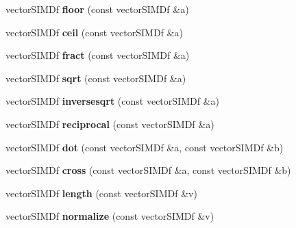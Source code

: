 \begin{DoxyCompactItemize}
\item 
vector\+S\+I\+M\+Df {\bfseries floor} (const vector\+S\+I\+M\+Df \&a)\hypertarget{namespaceirr_a913c3ea3611dc23b0fa62fd6e1348841}{}\label{namespaceirr_a913c3ea3611dc23b0fa62fd6e1348841}

\item 
vector\+S\+I\+M\+Df {\bfseries ceil} (const vector\+S\+I\+M\+Df \&a)\hypertarget{namespaceirr_a2ab9b9ed9c718fe4891c48f40ef6e8cc}{}\label{namespaceirr_a2ab9b9ed9c718fe4891c48f40ef6e8cc}

\item 
vector\+S\+I\+M\+Df {\bfseries fract} (const vector\+S\+I\+M\+Df \&a)\hypertarget{namespaceirr_a2ea9f347e3b1056ce5d974b19a832c30}{}\label{namespaceirr_a2ea9f347e3b1056ce5d974b19a832c30}

\item 
vector\+S\+I\+M\+Df {\bfseries sqrt} (const vector\+S\+I\+M\+Df \&a)\hypertarget{namespaceirr_a81e517d146fc58967964a00cabbb5fc3}{}\label{namespaceirr_a81e517d146fc58967964a00cabbb5fc3}

\item 
vector\+S\+I\+M\+Df {\bfseries inversesqrt} (const vector\+S\+I\+M\+Df \&a)\hypertarget{namespaceirr_a53e656bb85fc627fd78570e2ef4432ce}{}\label{namespaceirr_a53e656bb85fc627fd78570e2ef4432ce}

\item 
vector\+S\+I\+M\+Df {\bfseries reciprocal} (const vector\+S\+I\+M\+Df \&a)\hypertarget{namespaceirr_a1f503fb09c23545f0c1f1bcf82e096bb}{}\label{namespaceirr_a1f503fb09c23545f0c1f1bcf82e096bb}

\item 
vector\+S\+I\+M\+Df {\bfseries dot} (const vector\+S\+I\+M\+Df \&a, const vector\+S\+I\+M\+Df \&b)\hypertarget{namespaceirr_ae9fe6b99bb08338fef5ffa5d1107c05a}{}\label{namespaceirr_ae9fe6b99bb08338fef5ffa5d1107c05a}

\item 
vector\+S\+I\+M\+Df {\bfseries cross} (const vector\+S\+I\+M\+Df \&a, const vector\+S\+I\+M\+Df \&b)\hypertarget{namespaceirr_ad793371b2d476f613f660d76547ee36c}{}\label{namespaceirr_ad793371b2d476f613f660d76547ee36c}

\item 
vector\+S\+I\+M\+Df {\bfseries length} (const vector\+S\+I\+M\+Df \&v)\hypertarget{namespaceirr_a38b01789ebe90dc846880c7d0d52e055}{}\label{namespaceirr_a38b01789ebe90dc846880c7d0d52e055}

\item 
vector\+S\+I\+M\+Df {\bfseries normalize} (const vector\+S\+I\+M\+Df \&v)\hypertarget{namespaceirr_a3945df7f83f75c086d73ac6c7e956579}{}\label{namespaceirr_a3945df7f83f75c086d73ac6c7e956579}

\end{DoxyCompactItemize}


